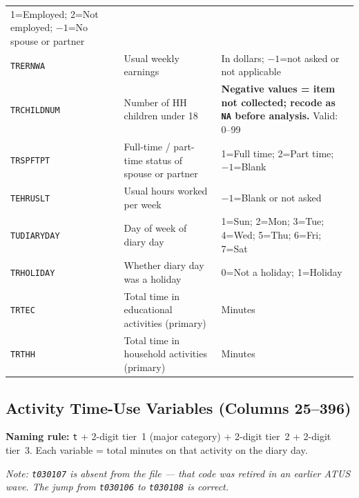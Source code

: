 \documentclass[11pt, a4paper]{article}
\begin{document}
\begin{longtable}{L{3cm} L{5.3cm} L{7cm}}
  1=Employed; 2=Not employed; $-1$=No spouse or partner \\
\texttt{TRERNWA}     & Usual weekly earnings &
  In dollars; $-1$=not asked or not applicable \\
 \texttt{TRCHILDNUM}  & Number of HH children under 18 &
  \textbf{Negative values = item not collected; recode as \texttt{NA}
  before analysis.} Valid: 0--99 \\
\texttt{TRSPFTPT}    & Full-time / part-time status of spouse or partner &
  1=Full time; 2=Part time; $-1$=Blank \\
 \texttt{TEHRUSLT}    & Usual hours worked per week &
  $-1$=Blank or not asked \\
\texttt{TUDIARYDAY}  & Day of week of diary day &
  1=Sun; 2=Mon; 3=Tue; 4=Wed; 5=Thu; 6=Fri; 7=Sat \\
 \texttt{TRHOLIDAY}   & Whether diary day was a holiday &
  0=Not a holiday; 1=Holiday \\
\texttt{TRTEC}       & Total time in educational activities (primary) & Minutes \\
 \texttt{TRTHH}       & Total time in household activities (primary) & Minutes \\
\end{longtable}

\subsection{Activity Time-Use Variables (Columns 25--396)}

\textbf{Naming rule:}
\texttt{t} + 2-digit tier~1 (major category) + 2-digit tier~2 + 2-digit tier~3.
Each variable = total minutes on that activity on the diary day.

\textit{Note: \texttt{t030107} is absent from the file --- that code was retired
in an earlier ATUS wave. The jump from \texttt{t030106} to \texttt{t030108} is
correct.}
\end{document}
